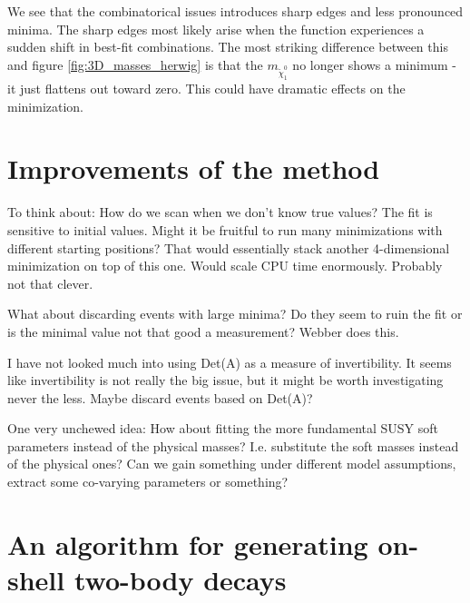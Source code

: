 \documentclass[twoside,english]{uiofysmaster}
\begin{document}
We see that the combinatorical issues introduces sharp edges and less pronounced minima. The sharp edges most likely arise when the function experiences a sudden shift in best-fit combinations. The most striking difference between this and figure \ref{fig:3D_masses_herwig} is that the $m_{\tilde \chi_1^0}$ no longer shows a minimum - it just flattens out toward zero. This could have dramatic effects on the minimization. 






\chapter{Improvements of the method}
To think about: How do we scan when we don't know true values? The fit is sensitive to initial values. Might it be fruitful to run many minimizations with different starting positions? That would essentially stack another 4-dimensional minimization on top of this one. Would scale CPU time enormously. Probably not that clever.

What about discarding events with large minima? Do they seem to ruin the fit or is the minimal value not that good a measurement? Webber does this. 

I have not looked much into using Det(A) as a measure of invertibility. It seems like invertibility is not really the big issue, but it might be worth investigating never the less. Maybe discard events based on Det(A)?

One very unchewed idea: How about fitting the more fundamental SUSY soft parameters instead of the physical masses? I.e. substitute the soft masses instead of the physical ones? Can we gain something under different model assumptions, extract some co-varying parameters or something?

\appendix

\chapter{An algorithm for generating on-shell two-body decays}
\label{ch:decayalgorithm}
\end{document}
